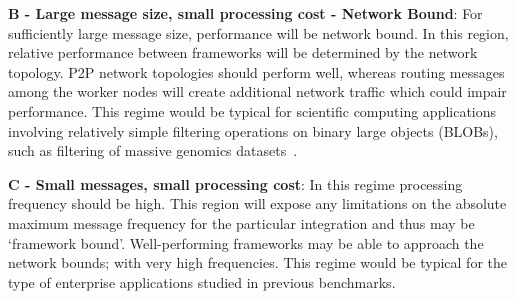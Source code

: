 \documentclass[conference]{IEEEtran}
\begin{document}
\textbf{B - Large message size, small processing cost - Network Bound}: For sufficiently large message size, performance will be network bound. In this region, relative performance between frameworks will be determined by the network topology. P2P network topologies should perform well, whereas routing messages among the worker nodes will create additional network traffic which could impair performance. This regime would be typical for scientific computing applications involving relatively simple filtering operations on binary large objects (BLOBs), such as filtering of massive genomics datasets~\cite{ausmeesBAMSIMulticloudService2018}.


\textbf{C - Small messages, small processing cost}: In this regime processing frequency should be high. This region will expose any limitations on the absolute maximum message frequency for the particular integration and thus may be `framework bound'. Well-performing frameworks may be able to approach the network bounds; with very high frequencies. This regime would be typical for the type of enterprise applications studied in previous benchmarks.%






\end{document}
